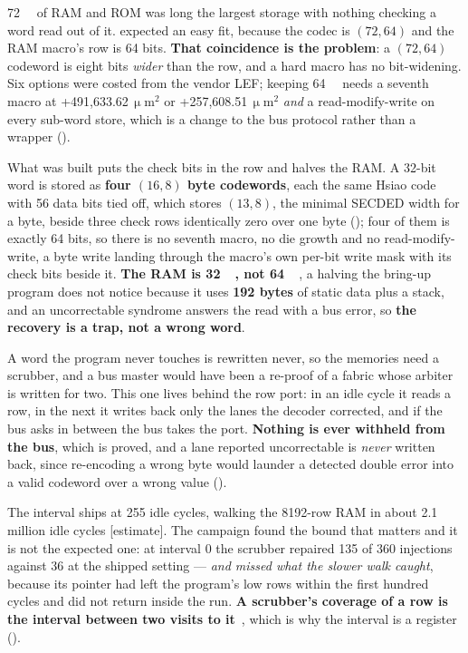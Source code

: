 \SI{72}{\kibi\byte} of RAM and ROM was long the largest storage with
nothing checking a word read out of it.  expected an easy fit,
because the codec is $(72,64)$ and the RAM macro's row is 64 bits.
\textbf{That coincidence is the problem}: a $(72,64)$ codeword is eight
bits \emph{wider} than the row, and a hard macro has no bit-widening.
Six options were costed from the vendor LEF; keeping
\SI{64}{\kibi\byte} needs a seventh macro at
+491{,}633.62\,$\upmu$m$^2$ or
+257{,}608.51\,$\upmu$m$^2$ \emph{and} a read-modify-write on
every sub-word store, which is a change to the bus protocol rather than
a wrapper ().

What was built puts the check bits in the row and halves the RAM. A
32-bit word is stored as \textbf{four $(16,8)$ byte codewords}, each the
same Hsiao code~\cite{hsiao1970} with 56 data bits tied off, which stores $(13,8)$, the
minimal SECDED width for a byte, beside three check rows identically
zero over one byte
(); four of them is exactly 64 bits, so there is no
seventh macro, no die growth and no read-modify-write, a byte write
landing through the macro's own per-bit write mask with its check bits
beside it. \textbf{The RAM is \SI{32}{\kibi\byte}, not
\SI{64}{\kibi\byte}}, a halving the bring-up program does not notice
because it uses \textbf{192 bytes} of static data plus a stack, and an
uncorrectable syndrome answers the read with a bus error, so \textbf{the
recovery is a trap, not a wrong word}.

A word the program never touches is rewritten never, so the memories
need a scrubber, and a bus master would have been a re-proof of a fabric
whose arbiter is written for two. This one lives behind the row port: in
an idle cycle it reads a row, in the next it writes back only the lanes
the decoder corrected, and if the bus asks in between the bus takes the
port. \textbf{Nothing is ever withheld from the bus}, which is proved,
and a lane reported uncorrectable is \emph{never} written back, since
re-encoding a wrong byte would launder a detected double error into a
valid codeword over a wrong value ().

The interval ships at 255 idle cycles, walking the 8192-row RAM in about
2.1 million idle cycles [estimate]. The campaign found the bound that matters and it
is not the expected one: at interval 0 the scrubber repaired 135 of 360
injections against 36 at the shipped setting --- \emph{and missed what
the slower walk caught}, because its pointer had left the program's low
rows within the first hundred cycles and did not return inside the run. \textbf{A scrubber's coverage of a row is the
interval between two visits to it}~\cite{saleh1990}, which is why the interval is a
register ().

